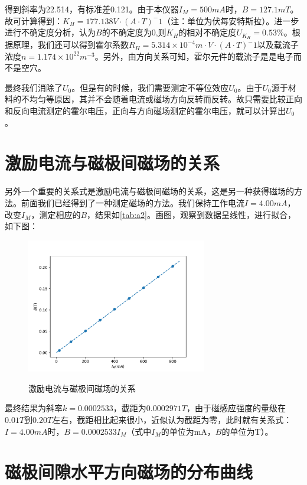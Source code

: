 \documentclass[12pt]{article}
\begin{document}
得到斜率为22.514，有标准差0.121。由于本仪器$I_M=500mA$时，$B=127.1mT$。故可计算得到：$K_H=177.138 V \cdot (A \cdot T)^-1$（注：单位为伏每安特斯拉）。进一步进行不确定度分析，认为$B$的不确定度为0,则$K_H$的相对不确定度$U_{K_H}=0.53\%$。根据原理，我们还可以得到霍尔系数$R_H=5.314\times10^{-4} m \cdot V \cdot (A \cdot T)^-1$以及载流子浓度$n=1.174\times10^{22}m^{-3}$。另外，由方向关系可知，霍尔元件的载流子是是电子而不是空穴。

最终我们消除了$U_0$。但是有的时候，我们需要测定不等位效应$U_0$。由于$U_0$源于材料的不均匀等原因，其并不会随着电流或磁场方向反转而反转。故只需要比较正向和反向电流测定的霍尔电压，正向与方向磁场测定的霍尔电压，就可以计算出$U_0$。

\section{激励电流与磁极间磁场的关系}

另外一个重要的关系式是激励电流与磁极间磁场的关系，这是另一种获得磁场的方法。前面我们已经得到了一种测定磁场的方法。我们保持工作电流$I=4.00mA$，改变$I_M$，测定相应的$B$，结果如\ref{tab:a2}。画图，观察到数据呈线性，进行拟合，如下图：

\begin{figure}[H]
    \centering
    \includegraphics[width=0.7\textwidth]{part3.pdf}
    \label{fig:2}
    \caption{激励电流与磁极间磁场的关系}
\end{figure}

最终结果为斜率$k=0.0002533$，截距为$0.0002971T$，由于磁感应强度的量级在$0.01T$到$0.20T$左右，截距相比起来很小，近似认为截距为零，此时就有关系式：$I=4.00mA$时，$B=0.0002533I_M$（式中$I_M$的单位为mA，$B$的单位为T）。

\section{磁极间隙水平方向磁场的分布曲线}
\end{document}
